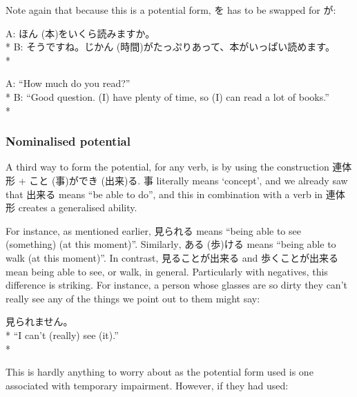 \documentclass[11pt, b5paper, twoside, openright, onecolumn]{book}
\makeatletter
\newcommand*{\rubystack}[2]{{\relscale{0.5}%
  \begin{tabular}[b]{@{}c@{}}%
    {#1}\\%
   {\textscale{2}{#2}}%
  \end{tabular}}%
}
\DeclareRobustCommand*{\ruby}[2]{%
  \mbox{%
    \setlength{\parskip}{0ex}%
    \BeginAccSupp{method=pdfstringdef,ActualText={#1}}%
      \rubystack{\phantom{#2}}{#1}%
      \llap{%
        \rubystack{#2}{\phantom{#1}}%
      }%
    \EndAccSupp{}%
  }%
}
\renewcommand*{\ruby}[2]{#2 (#1)}%
\newenvironment{exampleblock}{
\setlength{\parindent}{0.6in}
\begin{minipage}[t]{\dimexpr\textwidth-\parindent}}
{\end{minipage}}
\makeatother
\begin{document}
Note again that because this is a potential form‚ を has to be swapped for が:

\vspace{0.4cm}
\begin{exampleblock}
A: \ruby{本}{ほん}をいくら読みますか。 \\* 
B: そうですね。\ruby{時間}{じかん}がたっぷりあって、本がいっぱい読めます。 \\* 
\end{exampleblock}
\vspace{0.2cm}

\begin{exampleblock}
A: “How much do you read?” \\* 
B: “Good question. (I) have plenty of time‚ so (I) can read a lot of books.” \\* 
\end{exampleblock}
\subsubsection{Nominalised potential}


A third way to form the potential‚ for any verb‚ is by using the construction 連体形 + \ruby{事}{こと}が\ruby{出来}{でき}る. 事 literally means ‘concept’‚ and we already saw that 出来る means “be able to do”‚ and this in combination with a verb in 連体形 creates a generalised ability.

For instance‚ as mentioned earlier‚ 見られる means “being able to see (something) (at this moment)”. Similarly‚ \ruby{歩}{ある}ける means “being able to walk (at this moment)”. In contrast‚ 見ることが出来る and 歩くことが出来る mean being able to see‚ or walk‚ in general. Particularly with negatives‚ this difference is striking. For instance‚ a person whose glasses are so dirty they can’t really see any of the things we point out to them might say:

\vspace{0.4cm}
\begin{exampleblock}
見られません。 \\* 
“I can’t (really) see (it).” \\* 
\end{exampleblock}
\vspace{0.2cm}

This is hardly anything to worry about as the potential form used is one associated with temporary impairment. However‚ if they had used:
\end{document}
